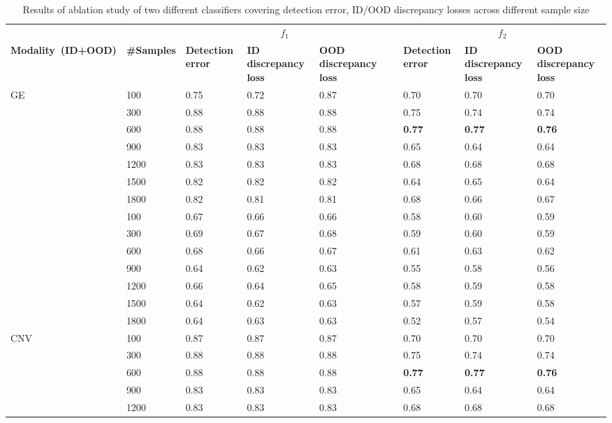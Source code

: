 \iffalse
\begin{table}
	\centering
	\caption{Results of ablation study of two different classifiers covering detection error, ID/OOD discrepancy losses across different sample size} 
	\scriptsize{
	\begin{tabular}{lllllllll}
		& & \multicolumn{3}{c}{\bfseries{$f_1$}} && \multicolumn{3}{c}{\bfseries{$f_2$}} \\	
		\cmidrule{3-5}\cmidrule{7-9}   
		\textbf{Modality~(ID+OOD)}&\textbf{\#Samples}& \textbf{Detection error} & \textbf{ID discrepancy loss}& \textbf{OOD discrepancy loss} 
		&& \textbf{Detection error} & \textbf{ID discrepancy loss}& \textbf{OOD discrepancy loss}\\
		\hline
		\multirow{8}{*}{{GE}} & 100 & 0.75 & 0.72 & 0.87 && 0.70 & 0.70 & 0.70\\
		& 300 & 0.88 & 0.88 & 0.88  && 0.75 & 0.74 & 0.74 \\
    	& 600 & 0.88 & 0.88 & 0.88 && \textbf{0.77} & \textbf{0.77} & \textbf{0.76} \\
		& 900 & 0.83 & 0.83 & 0.83 && 0.65 & 0.64 & 0.64\\
		& 1200 & 0.83 & 0.83 & 0.83 && 0.68 & 0.68 & 0.68\\
		& 1500 & 0.82 & 0.82 & 0.82 && 0.64 & 0.65 & 0.64\\
		& 1800 & 0.82 & 0.81 & 0.81 && 0.68 & 0.66 & 0.67\\
		\hline
		\multirow{8}{*}{{MR}} & 100 & 0.67 & 0.66 & 0.66 && 0.58 & 0.60 & 0.59\\
		& 300 & 0.69 & 0.67 & 0.68 && 0.59 & 0.60 & 0.59\\
		& 600 & 0.68 & 0.66 & 0.67 && 0.61 & 0.63 & 0.62\\
		& 900 & 0.64 & 0.62 & 0.63 && 0.55 & 0.58 & 0.56\\
		& 1200 & 0.66 & 0.64 & 0.65 && 0.58 & 0.59 & 0.58\\
		& 1500 & 0.64 & 0.62 & 0.63 && 0.57 & 0.59 & 0.58\\
		& 1800 & 0.64 & 0.63 & 0.63 && 0.52 & 0.57 & 0.54\\
		\hline
		\multirow{8}{*}{{CNV}} & 100 & 0.87 & 0.87 & 0.87 && 0.70 & 0.70 & 0.70\\
		& 300 & 0.88 & 0.88 & 0.88  && 0.75 & 0.74 & 0.74 \\
    	& 600 & 0.88 & 0.88 & 0.88 && \textbf{0.77} & \textbf{0.77} & \textbf{0.76} \\
		& 900 & 0.83 & 0.83 & 0.83 && 0.65 & 0.64 & 0.64\\
		& 1200 & 0.83 & 0.83 & 0.83 && 0.68 & 0.68 & 0.68\\

\end{tabular}}
\end{table}
